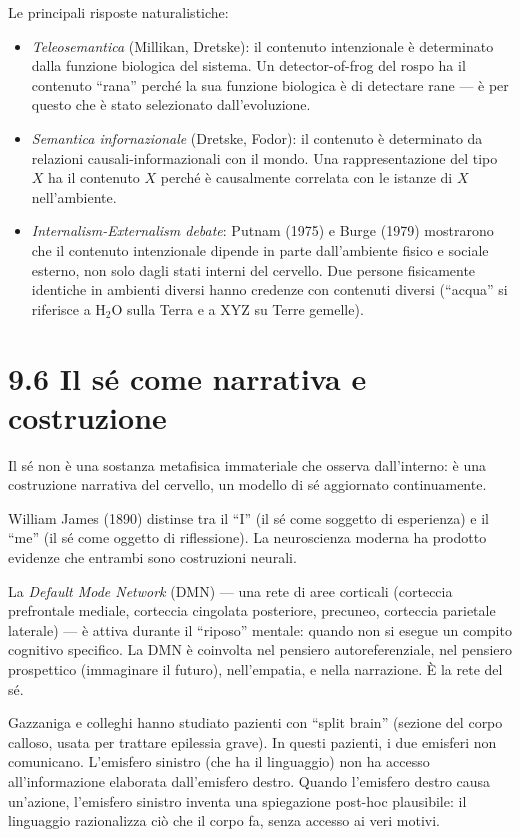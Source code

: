 \documentclass[11.5pt,a4paper,openany]{book}
\theoremstyle{remark}
\begin{document}
Le principali risposte naturalistiche:
\begin{itemize}
\item \textit{Teleosemantica} (Millikan, Dretske): il contenuto intenzionale è determinato dalla funzione biologica del sistema. Un detector-of-frog del rospo ha il contenuto ``rana'' perché la sua funzione biologica è di detectare rane --- è per questo che è stato selezionato dall'evoluzione.
\item \textit{Semantica infornazionale} (Dretske, Fodor): il contenuto è determinato da relazioni causali-informazionali con il mondo. Una rappresentazione del tipo $X$ ha il contenuto $X$ perché è causalmente correlata con le istanze di $X$ nell'ambiente.
\item \textit{Internalism-Externalism debate}: Putnam (1975) e Burge (1979) mostrarono che il contenuto intenzionale dipende in parte dall'ambiente fisico e sociale esterno, non solo dagli stati interni del cervello. Due persone fisicamente identiche in ambienti diversi hanno credenze con contenuti diversi (``acqua'' si riferisce a H$_2$O sulla Terra e a XYZ su Terre gemelle).
\end{itemize}

\section{9.6 Il sé come narrativa e costruzione}

Il sé non è una sostanza metafisica immateriale che osserva dall'interno: è una costruzione narrativa del cervello, un modello di sé aggiornato continuamente.

William James (1890) distinse tra il ``I'' (il sé come soggetto di esperienza) e il ``me'' (il sé come oggetto di riflessione). La neuroscienza moderna ha prodotto evidenze che entrambi sono costruzioni neurali.

La \textit{Default Mode Network} (DMN) --- una rete di aree corticali (corteccia prefrontale mediale, corteccia cingolata posteriore, precuneo, corteccia parietale laterale) --- è attiva durante il ``riposo'' mentale: quando non si esegue un compito cognitivo specifico. La DMN è coinvolta nel pensiero autoreferenziale, nel pensiero prospettico (immaginare il futuro), nell'empatia, e nella narrazione. È la rete del sé.

Gazzaniga e colleghi hanno studiato pazienti con ``split brain'' (sezione del corpo calloso, usata per trattare epilessia grave). In questi pazienti, i due emisferi non comunicano. L'emisfero sinistro (che ha il linguaggio) non ha accesso all'informazione elaborata dall'emisfero destro. Quando l'emisfero destro causa un'azione, l'emisfero sinistro inventa una spiegazione post-hoc plausibile: il linguaggio razionalizza ciò che il corpo fa, senza accesso ai veri motivi.
\end{document}
